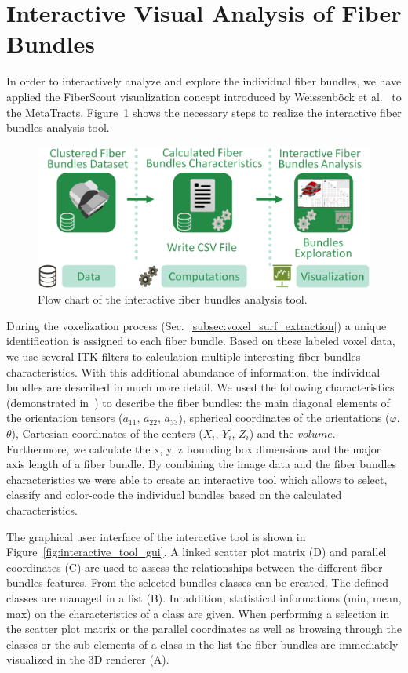 \section{Interactive Visual Analysis of Fiber Bundles}
In order to interactively analyze and explore the individual fiber bundles, we have applied the FiberScout visualization concept introduced by Weissenb{\"o}ck et al.~\cite{Weissenbock2014} to the MetaTracts. Figure~\ref{fig:metatracts_fiberscout_workflow} shows the necessary steps to realize the interactive fiber bundles analysis tool.

\begin{figure}[htb]
	\centering
	\includegraphics[width=0.9\linewidth]{images/MetaTractsToFiberScout_workflow.eps}
	\caption{Flow chart of the interactive fiber bundles analysis tool.}
	\label{fig:metatracts_fiberscout_workflow}
\end{figure}

During the voxelization process (Sec.~\ref{subsec:voxel_surf_extraction}) a unique identification is assigned to each fiber bundle. Based on these labeled voxel data, we use several ITK\cite{Ibanez2005} filters to calculation multiple interesting fiber bundles characteristics. With this additional abundance of information, the individual bundles are described in much more detail.
We used the following characteristics (demonstrated in~\cite{Weissenbock2014}) to describe the fiber bundles: the main diagonal elements of the orientation tensors ($a_{11}$, $a_{22}$, $a_{33}$), spherical coordinates of the orientations ($\varphi$, $\theta$), Cartesian coordinates of the centers ($X_{i}$, $Y_{i}$, $Z_{i}$) and the $volume$. Furthermore, we calculate the x, y, z bounding box dimensions and the major axis length of a fiber bundle. By combining the image data and the fiber bundles characteristics we were able to create an interactive tool which allows to select, classify and color-code the individual bundles based on the calculated characteristics.

The graphical user interface of the interactive tool is shown in Figure~\ref{fig:interactive_tool_gui}. A linked scatter plot matrix (D) and parallel coordinates (C) are used to assess the relationships between the different fiber bundles features. From the selected bundles classes can be created. The defined classes are managed in a list (B). In addition, statistical informations (min, mean, max) on the characteristics of a class are given. When performing a selection in the scatter plot matrix or the parallel coordinates as well as browsing through the classes or the sub elements of a class in the list the fiber bundles are immediately visualized in the 3D renderer (A).


